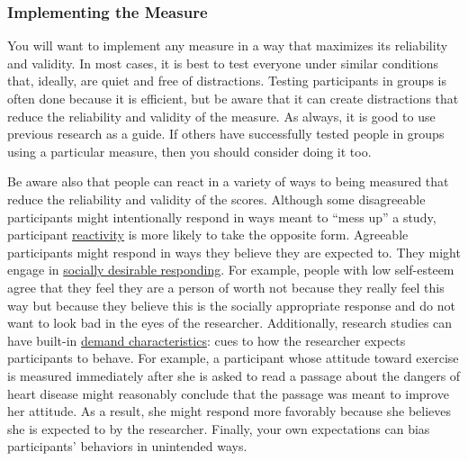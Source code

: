 \documentclass[
]{krantz}
\begin{document}
\subsubsection*{Implementing the Measure}\label{implementing-the-measure}


You will want to implement any measure in a way that maximizes its reliability and validity. In most cases, it is best to test everyone under similar conditions that, ideally, are quiet and free of distractions. Testing participants in groups is often done because it is efficient, but be aware that it can create distractions that reduce the reliability and validity of the measure. As always, it is good to use previous research as a guide. If others have successfully tested people in groups using a particular measure, then you should consider doing it too.

Be aware also that people can react in a variety of ways to being measured that reduce the reliability and validity of the scores. Although some disagreeable participants might intentionally respond in ways meant to ``mess up'' a study, participant \hyperref[reactivity]{reactivity} is more likely to take the opposite form. Agreeable participants might respond in ways they believe they are expected to. They might engage in \hyperref[socially-desirable-responding]{socially desirable responding}. For example, people with low self-esteem agree that they feel they are a person of worth not because they really feel this way but because they believe this is the socially appropriate response and do not want to look bad in the eyes of the researcher. Additionally, research studies can have built-in \hyperref[demand-characteristics]{demand characteristics}: cues to how the researcher expects participants to behave. For example, a participant whose attitude toward exercise is measured immediately after she is asked to read a passage about the dangers of heart disease might reasonably conclude that the passage was meant to improve her attitude. As a result, she might respond more favorably because she believes she is expected to by the researcher. Finally, your own expectations can bias participants' behaviors in unintended ways.
\end{document}
